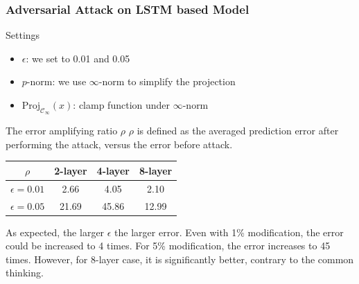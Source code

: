 \documentclass{beamer}
\begin{document}
\begin{frame}
\frametitle{Adversarial Attack on LSTM based Model}
\begin{block}{Settings}
\begin{itemize}
\setlength\itemsep{0em}
\item $\epsilon$: we set to 0.01 and 0.05
\item $p$-norm: we use $\infty$-norm to simplify the projection
\item $\text{Proj}_{\mathcal{C}_\infty}(x)$: clamp function under $\infty$-norm
\end{itemize}
\end{block}

\begin{block}{The error amplifying ratio $\rho$}
$\rho$ is defined as the averaged prediction error after performing the attack, versus the error before attack.

\begin{table}[]
\begin{tabular}{c|ccc}
$\rho$          & 2-layer & 4-layer & 8-layer  \\
\hline
$\epsilon=0.01$ & 2.66  & 4.05  & 2.10 \\
$\epsilon=0.05$ & 21.69 & 45.86 & 12.99  \\
\end{tabular}
\end{table}
\vspace{-0.1in}
As expected, the larger $\epsilon$ the larger error. Even with 1\% modification, the error could be increased to 4 times. For 5\% modification, the error increases to 45 times.
However, for 8-layer case, it is significantly better, contrary to the common thinking.
\end{block}
\end{frame}
\end{document}
